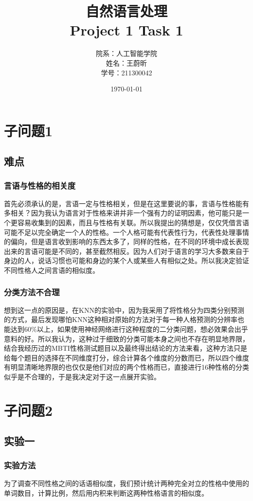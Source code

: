 \documentclass{article}
\title{\huge  自然语言处理\\ \large Project 1 Task 1}
\author{院系：人工智能学院\\姓名：王蔚昕\\学号：211300042}
\date{\today}
\begin{document}
	\maketitle
	\newpage
	\tableofcontents
	\newpage
	\section{子问题1}
	\subsection{难点}
	\subsubsection{言语与性格的相关度}
	首先必须承认的是，言语一定与性格相关，但是在这里要说的事，言语与性格能有多相关？因为我认为语言对于性格来讲并非一个强有力的证明因素，他可能只是一个更容易收集到的因素，而且与性格有关联。所以我提出的猜想是，仅仅凭借言语可能不足以完全确定一个人的性格。一个人格可能有代表性行为，代表性处理事情的偏向，但是语言收到影响的东西太多了，同样的性格，在不同的环境中成长表现出来的言语可能是不同的，甚至截然相反。因为人们对于语言的学习大多数来自于身边的人，说话习惯也可能和身边的某个人或某些人有相似之处。所以我决定验证不同性格人之间言语的相似度。
	\subsubsection{分类方法不合理}
	想到这一点的原因是，在KNN的实验中，因为我采用了将性格分为四类分别预测的方式，最后发现哪怕KNN这种相对原始的方法对于每一种人格预测的分辨率也能达到60\%以上，如果使用神经网络进行这种程度的二分类问题，想必效果会出乎意料的好。所以我认为，这种过于细致的分类可能本身之间也不存在明显地界限，结合我经历过的MBTI性格测试题目以及最终得出结论的方法来看，这种方法只是给每个题目的选择在不同维度打分，综合计算各个维度的分数而已，所以四个维度有明显清晰地界限的也仅仅是他们对应的两个性格而已，直接进行16种性格的分类似乎是不合理的，于是我决定对于这一点展开实验。
	\section{子问题2}
	\subsection{实验一}
	\subsubsection{实验方法}
	为了调查不同性格之间的话语相似度，我们预计统计两种完全对立的性格中使用的单词数目，计算比例，然后用内积来判断这两种性格语言的相似度。
\end{document}
